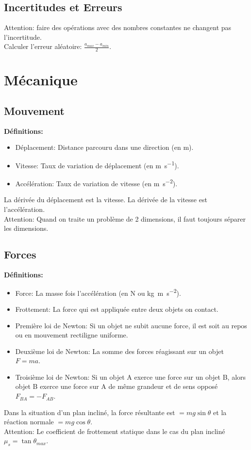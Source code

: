 \documentclass[french, a4paper, 12pt]{article}
\begin{document}
\subsection{Incertitudes et Erreurs}
Attention: faire des opérations avec des nombres constantes ne changent pas l'incertitude.\\
Calculer l'erreur aléatoire: $\frac{a_{max}-a_{min}}{2}$.
\pagebreak

\section{Mécanique}
\subsection{Mouvement}
\textbf{Définitions:}
\begin{itemize}
\item Déplacement: Distance parcouru dans une direction (en \si{\metre}).
\item Vitesse: Taux de variation de déplacement (en \si{\metre\per\second}).
\item Accélération: Taux de variation de vitesse (en \si{\metre\per\second\squared}).
\end{itemize}
La dérivée du déplacement est la vitesse. La dérivée de la vitesse est l'accélération.\\
Attention: Quand on traite un problème de 2 dimensions, il faut toujours séparer les dimensions.

\subsection{Forces}
\textbf{Définitions:}
\begin{itemize}
\item Force: La masse fois l'accélération (en \si{\newton} ou \si{\kilogram\metre\per\second\squared}).
\item Frottement: La force qui est appliquée entre deux objets on contact.
\item Première loi de Newton: Si un objet ne subit aucune force, il est soit au repos ou en mouvement rectiligne uniforme.
\item Deuxième loi de Newton: La somme des forces réagissant sur un objet $F=ma$.
\item Troisième loi de Newton: Si un objet A exerce une force sur un objet B, alors objet B exerce une force sur A de même grandeur et de sens opposé $F_{BA}=-F_{AB}$.
\end{itemize}
Dans la situation d'un plan incliné, la force résultante est $=mg\sin \theta$ et la réaction normale $=mg\cos \theta$.\\
Attention: Le coefficient de frottement statique dans le cas du plan incliné $\mu _s =\tan\theta_{max}$.
\end{document}
